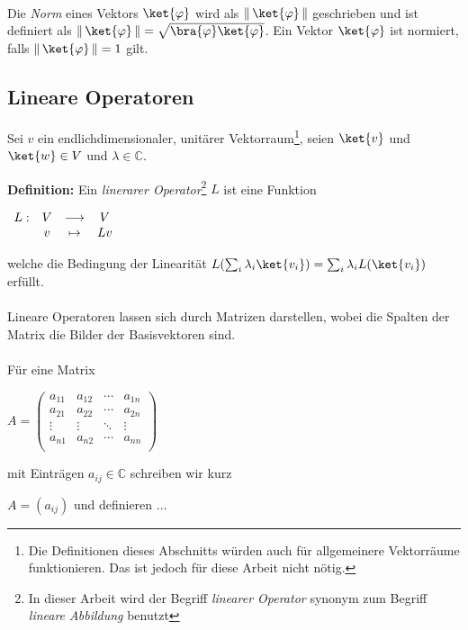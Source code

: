 \paragraph{}
Die \textit{Norm} eines Vektors $\ket{\varphi}$ wird als $\left\| \, \ket{\varphi} \, \right\|$ geschrieben und ist definiert als $\left\| \, \ket{\varphi} \, \right\| = \sqrt{\bra{\varphi}\ket{\varphi}}$. Ein Vektor $\ket{\varphi}$ ist normiert, falls $\left\| \, \ket{\varphi} \, \right\| = 1$ gilt. 

\subsection{Lineare Operatoren}
Sei $v$ ein endlichdimensionaler, unitärer Vektorraum\footnote{Die Definitionen dieses Abschnitts würden auch für allgemeinere Vektorräume funktionieren. Das ist jedoch für diese Arbeit nicht nötig.}, seien $\ket{v}$ und $\ket{w} \in V$ und $\lambda \in \mathbb{C}$.

\textbf{Definition:} Ein \textit{linerarer Operator}\footnote{In dieser Arbeit wird der Begriff \textit{linearer Operator} synonym zum Begriff \textit{lineare Abbildung} benutzt} $L$ ist eine Funktion

\vspace{0.2cm}
\hspace{5cm}$\begin{array}{ l c c c}

L:  &  V & \longrightarrow & V \\
& v & \mapsto & Lv \\
\end{array}$
\vspace{0.2cm}

welche die Bedingung der Linearität $L(\sum_i{\lambda_i\ket{v_i}}) = \sum_i{\lambda_iL(\ket{v_i})}$ erfüllt. 

\paragraph{}
Lineare Operatoren lassen sich durch Matrizen darstellen, wobei die Spalten der Matrix die Bilder der Basisvektoren sind.
\paragraph{}

Für eine Matrix

\vspace{0.5cm}
$A=\begin{pmatrix}
a_{11} & a_{12} & \cdots & a_{1n} \\
a_{21} & a_{22} & \cdots  &  a_{2n} \\
\vdots & \vdots & \ddots  & \vdots \\
a_{n1} & a_{n2} & \cdots  & a_{nn} \\
\end{pmatrix}$  
\quad\begin{minipage}{7cm}
mit Einträgen $a_{ij}\in \mathbb{C}$ schreiben wir kurz 

\hspace{2cm}$A=(a_{ij})$  und definieren $\ldots$
\end{minipage}


